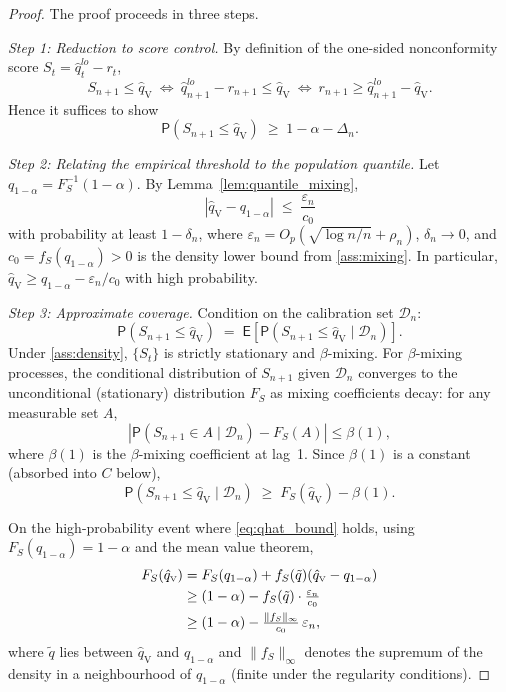 \documentclass[11pt]{article}
\newcommand{\E}{\mathsf{E}}
\renewcommand{\P}{\mathsf{P}}
\newcommand{\qV}{\hat{q}_{\scriptscriptstyle\mathrm{V}}}
\begin{document}
\begin{proof}
The proof proceeds in three steps.

\textit{Step 1: Reduction to score control.}\enspace
By definition of the one-sided nonconformity score
$S_t = \hat q_t^{lo}-r_t$,
\[
S_{n+1}\le \qV
\ \Longleftrightarrow\
\hat q_{n+1}^{lo}-r_{n+1} \le \qV
\ \Longleftrightarrow\
r_{n+1} \ge \hat q^{lo}_{n+1}-\qV.
\]
Hence it suffices to show
\begin{equation}\label{eq:target}
\P(S_{n+1}\le \qV) \;\ge\; 1-\alpha - \Delta_n.
\end{equation}

\textit{Step 2: Relating the empirical threshold to the population
quantile.}\enspace
Let $q_{1-\alpha}=F_S^{-1}(1-\alpha)$. By
Lemma~\ref{lem:quantile_mixing},
\begin{equation}\label{eq:qhat_bound}
|\qV - q_{1-\alpha}| \;\le\; \frac{\varepsilon_n}{c_0}
\end{equation}
with probability at least $1-\delta_n$, where
$\varepsilon_n = O_p(\sqrt{\log n / n}+\rho_n)$,
$\delta_n\to 0$, and $c_0 = f_S(q_{1-\alpha})>0$ is the density
lower bound from \ref{ass:mixing}.
In particular, $\qV \ge q_{1-\alpha} - \varepsilon_n/c_0$ with
high probability.

\textit{Step 3: Approximate coverage.}\enspace
Condition on the calibration set $\mathcal D_n$:
\[
\P(S_{n+1}\le \qV)
\;=\; \E\!\left[\P(S_{n+1}\le \qV \mid \mathcal D_n)\right].
\]
Under \ref{ass:density}, $\{S_t\}$ is strictly stationary and
$\beta$-mixing. For $\beta$-mixing processes, the conditional
distribution of $S_{n+1}$ given $\mathcal D_n$ converges to the
unconditional (stationary) distribution $F_S$ as mixing
coefficients decay: for any measurable set $A$,
\[
|\P(S_{n+1}\in A \mid \mathcal D_n) - F_S(A)| \le \beta(1),
\]
where $\beta(1)$ is the $\beta$-mixing coefficient at lag~1.
Since $\beta(1)$ is a constant (absorbed into $C$ below),
\begin{equation}\label{eq:conditional}
\P(S_{n+1}\le \qV \mid \mathcal D_n)
\;\ge\; F_S(\qV) - \beta(1).
\end{equation}

On the high-probability event where \eqref{eq:qhat_bound} holds,
using $F_S(q_{1-\alpha})=1-\alpha$ and the mean value theorem,
\begin{align}
F_S(\qV)
&= F_S(q_{1-\alpha})
+ f_S(\tilde q)(\qV - q_{1-\alpha}) \notag\\
&\ge (1-\alpha) - f_S(\tilde q)\cdot
\tfrac{\varepsilon_n}{c_0} \notag\\
&\ge (1-\alpha) - \tfrac{\|f_S\|_\infty}{c_0}\,\varepsilon_n,
\label{eq:FS_bound}
\end{align}
where $\tilde q$ lies between $\qV$ and $q_{1-\alpha}$ and
$\|f_S\|_\infty$ denotes the supremum of the density in a
neighbourhood of $q_{1-\alpha}$ (finite under the regularity
conditions).


\end{proof}
\end{document}
